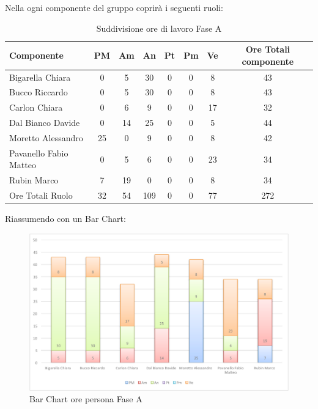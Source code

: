 				Nella  ogni componente del gruppo \groupname{} coprirà i seguenti ruoli:
				\begin{table}[H]
					\begin{center}
						\begin{tabular}{| l | c | c | c | c | c | c | c |}
							\hline
							Componente 					& PM	& Am 		& An 		& Pt 	& Pm 	& Ve 		& Ore Totali componente \\ \hline
							
							Bigarella Chiara 			& 0		& 5 		& 30 		& 0		& 0		& 8 		& 43 \\
							Bucco Riccardo 				& 0		& 5 		& 30 		& 0		& 0		& 8 		& 43 \\
							Carlon Chiara	 			& 0		& 6 		& 9 		& 0		& 0		& 17 		& 32 \\
							Dal Bianco Davide 			& 0		& 14 		& 25 		& 0		& 0		& 5 		& 44 \\
							Moretto Alessandro 			& 25 	& 0			& 9 		& 0		& 0		& 8 		& 42 \\
							Pavanello Fabio Matteo	 	& 0		& 5 		& 6 		& 0		& 0		& 23 		& 34 \\
							Rubin Marco					& 7 	& 19 		& 0			& 0		& 0		& 8 		& 34 \\ \hline \hline
							
							Ore Totali Ruolo 			& 32 	& 54 		& 109 		& 0		& 0		& 77 		& 272\\ \hline
						\end{tabular}
					\end{center}
					\caption{Suddivisione ore di lavoro Fase A}
				\end{table}
				Riassumendo con un Bar Chart:
				\begin{figure}[H]\centering
					\includegraphics[width=\textwidth]{PianoDiProgetto/Pics/ChartOreFaseA.pdf}
					\caption{Bar Chart ore persona Fase A}
				\end{figure}
